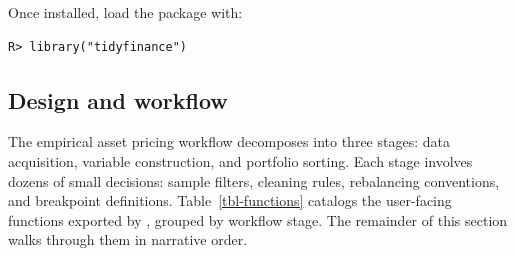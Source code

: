 \documentclass[
  article]{jss}
\begin{document}
Once installed, load the package with:

\begin{verbatim}
R> library("tidyfinance")
\end{verbatim}

\subsection{Design and workflow}\label{sec-design}

The empirical asset pricing workflow decomposes into three stages: data
acquisition, variable construction, and portfolio sorting. Each stage
involves dozens of small decisions: sample filters, cleaning rules,
rebalancing conventions, and breakpoint definitions.
Table~\ref{tbl-functions} catalogs the user-facing functions exported by
, grouped by workflow stage. The remainder of this
section walks through them in narrative order.

\begingroup\small
\setlength{\tabcolsep}{4pt}
\renewcommand{\arraystretch}{1.0}
\end{document}
